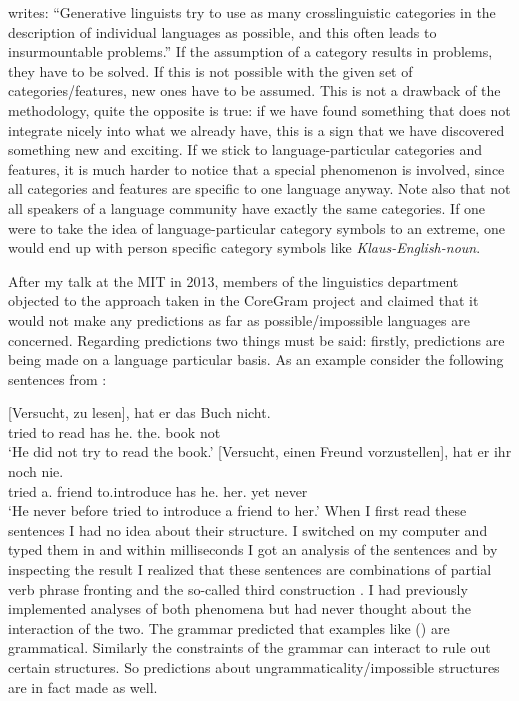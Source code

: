 \citet[]{Haspelmath2010b} writes: ``Generative linguists try to use as many crosslinguistic
  categories in the description of individual languages as possible, and this often leads to
  insurmountable problems.'' If the assumption of a category results in problems, they have to be
solved. If this is not possible with the given set of categories/features, new ones have to be
assumed. This is not a drawback of the methodology, quite the opposite is true: if we have found
something that does not integrate nicely into what we already have, this is a sign that we have discovered
something new and exciting. %
If we stick to language-particular categories and features, it is much
harder to notice that a special phenomenon is involved, since all categories and features are
specific to one language anyway. Note also that not all speakers of a language community have
exactly the same categories. If one were to take the idea of language-particular category symbols to
an extreme, one would end up with person specific category symbols like \emph{Klaus-English-noun}.

After my talk at the MIT in 2013, members of the linguistics department objected to the
approach taken in the CoreGram project and claimed that it would not make any predictions as far as possible/impossible languages
are concerned. Regarding predictions two things must be said: firstly, predictions are being made on a
language particular basis. As an example consider the following sentences from \citet{Netter91}:


\eal
\ex 
\gll {}[Versucht, zu lesen], hat er das Buch nicht.\\
       \spacebr{}tried to read has he.\nom{} the.\acc{} book not\\
\glt `He did not try to read the book.'
\ex 
\gll {}[Versucht, einen Freund vorzustellen], hat er ihr noch nie.\\
       \spacebr{}tried a.\acc{} friend to.introduce has he.\nom{} her.\dat{} yet never\\
\glt `He never before tried to introduce a friend to her.'
\zl
When I first read these sentences I had no idea about their structure. I switched on my computer and typed them
in and within milliseconds I got an analysis of the sentences and by inspecting the result I realized
that these sentences are combinations of partial verb phrase fronting and the so-called third
construction \citep[]{Mueller99a}. I had previously implemented analyses of both phenomena
but had never thought about the interaction of
the two. The grammar predicted that examples like () are grammatical. Similarly the
constraints of the grammar can interact to rule out certain structures. So predictions about
ungrammaticality/impossible structures are in fact made as well.

